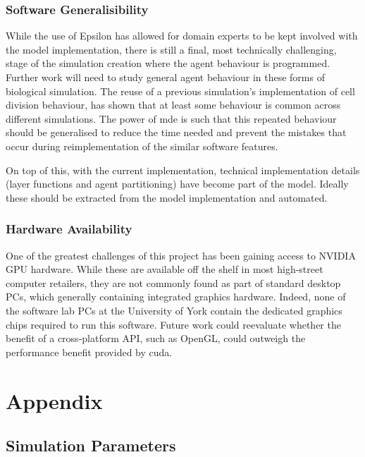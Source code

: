 \documentclass{UoYCSproject}
\begin{document}
\subsection{Software Generalisibility}%
While the use of Epsilon has allowed for domain experts to be kept involved with the model implementation, there is still a final, most technically challenging, stage of the simulation creation where the agent behaviour is programmed.
Further work will need to study general agent behaviour in these forms of biological simulation.
The reuse of a previous simulation's implementation of cell division behaviour, has shown that at least some behaviour is common across different simulations.
The power of \gls{mde} is such that this repeated behaviour should be generalised to reduce the time needed and prevent the mistakes that occur during reimplementation of the similar software features.

On top of this, with the current implementation, technical implementation details (layer functions and agent partitioning) have become part of the model.
Ideally these should be extracted from the model implementation and automated.

\subsection{Hardware Availability}
One of the greatest challenges of this project has been gaining access to NVIDIA GPU hardware.
While these are available off the shelf in most high-street computer retailers, they are not commonly found as part of standard desktop PCs, which generally containing integrated graphics hardware.
Indeed, none of the software lab PCs at the University of York contain the dedicated graphics chips required to run this software.
Future work could reevaluate whether the benefit of a cross-platform API, such as OpenGL, could outweigh the performance benefit provided by \acrshort{cuda}.

\printbibliography
\chapter{Appendix}
\section{Simulation Parameters}
\end{document}
